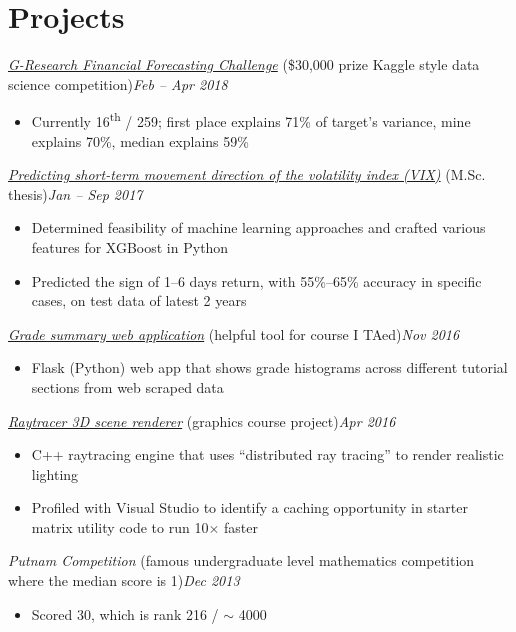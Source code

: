 \documentclass[10pt,letterpaper]{article}
\newcommand*\position[1]{\textit{#1}}
\newcommand*\timespan\position
\begin{document}
\section*{Projects}
\position{\href{https://financialforecasting.gresearch.co.uk/}{G-Research Financial Forecasting Challenge}} (\$30,000 prize Kaggle style data science competition)\hfill\timespan{Feb -- Apr 2018}
\begin{itemize}
\item Currently 16\textsuperscript{th} / 259; first place explains 71\% of target's variance, mine explains 70\%, median explains 59\%
\end{itemize}
\position{\href{https://tspace.library.utoronto.ca/bitstream/1807/79328/3/Yu_Michael_Y_201711_MSc_thesis.pdf}{Predicting short-term movement direction of the volatility index (VIX)}} (M.Sc. thesis)\hfill\timespan{Jan -- Sep 2017}
\begin{itemize}
\item Determined feasibility of machine learning approaches and crafted various features for XGBoost in Python
\item Predicted the sign of 1--6 days return, with 55\%--65\% accuracy in specific cases, on test data of latest 2 years
\end{itemize}
\position{\href{https://github.com/yumichael/blackboardlearn-statsview}{Grade summary web application}} (helpful tool for course I TAed)\hfill\timespan{Nov 2016}
\begin{itemize}
\item Flask (Python) web app that shows grade histograms across different tutorial sections from web scraped data
\end{itemize}
\position{\href{https://github.com/yumichael/raytrace}{Raytracer 3D scene renderer}} (graphics course project)\hfill\timespan{Apr 2016}
\begin{itemize}
\item C++ raytracing engine that uses ``distributed ray tracing'' to render realistic lighting
\item Profiled with Visual Studio to identify a caching opportunity in starter matrix utility code to run 10\(\times\) faster
\end{itemize}
\position{Putnam Competition} (famous undergraduate level mathematics competition where the median score is 1)\hfill\timespan{Dec 2013}
\begin{itemize}
\item Scored 30, which is rank 216 / \(\sim\) 4000
\end{itemize}
\end{document}
